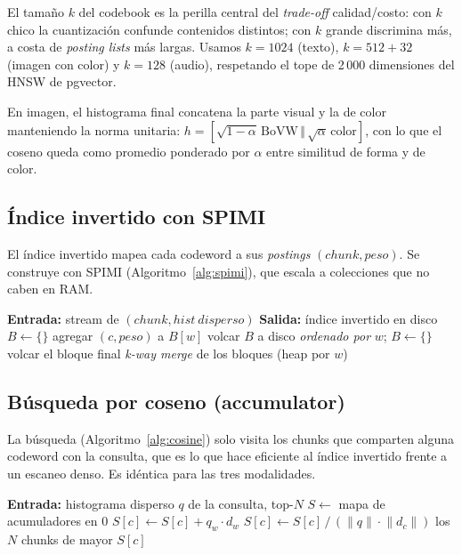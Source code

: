\documentclass[conference]{IEEEtran}
\begin{document}
El tamaño $k$ del codebook es la perilla central del \textit{trade-off}
calidad/costo: con $k$ chico la cuantización confunde contenidos distintos;
con $k$ grande discrimina más, a costa de \textit{posting lists} más largas.
Usamos $k{=}1024$ (texto), $k{=}512{+}32$ (imagen con color) y $k{=}128$
(audio), respetando el tope de 2\,000 dimensiones del HNSW de pgvector.

En imagen, el histograma final concatena la parte visual y la de color
manteniendo la norma unitaria:
$h = [\sqrt{1-\alpha}\,\mathrm{BoVW} \,\Vert\, \sqrt{\alpha}\,\mathrm{color}]$,
con lo que el coseno queda como promedio ponderado por $\alpha$ entre
similitud de forma y de color.

\subsection{Índice invertido con SPIMI}
El índice invertido mapea cada codeword a sus \textit{postings}
$(\mathit{chunk}, \mathit{peso})$. Se construye con SPIMI
(Algoritmo~\ref{alg:spimi}), que escala a colecciones que no caben en RAM.

\begin{algorithm}[htbp]
\caption{SPIMI: construcción del índice invertido}
\label{alg:spimi}
\begin{algorithmic}[1]
\STATE \textbf{Entrada:} stream de $(\mathit{chunk}, \mathit{hist\ disperso})$
\STATE \textbf{Salida:} índice invertido en disco
\STATE $B \gets \{\}$ 
    \STATE agregar $(c, \mathit{peso})$ a $B[w]$
  \ENDFOR
    \STATE volcar $B$ a disco \emph{ordenado por} $w$; $B \gets \{\}$
  \ENDIF
\ENDFOR
\STATE volcar el bloque final
\RETURN \textit{k-way merge} de los bloques (heap por $w$)
\end{algorithmic}
\end{algorithm}

\subsection{Búsqueda por coseno (accumulator)}
La búsqueda (Algoritmo~\ref{alg:cosine}) solo visita los chunks que comparten
alguna codeword con la consulta, que es lo que hace eficiente al índice
invertido frente a un escaneo denso. Es idéntica para las tres modalidades.

\begin{algorithm}[htbp]
\caption{CosineScore sobre el índice invertido}
\label{alg:cosine}
\begin{algorithmic}[1]
\STATE \textbf{Entrada:} histograma disperso $q$ de la consulta, top-$N$
\STATE $S \gets$ mapa de acumuladores en 0
    \STATE $S[c] \gets S[c] + q_w \cdot d_w$
  \ENDFOR
\ENDFOR
{}
  \STATE $S[c] \gets S[c] \,/\, (\lVert q\rVert \cdot \lVert d_c\rVert)$
\ENDFOR
\RETURN los $N$ chunks de mayor $S[c]$
\end{algorithmic}
\end{algorithm}
\end{document}
